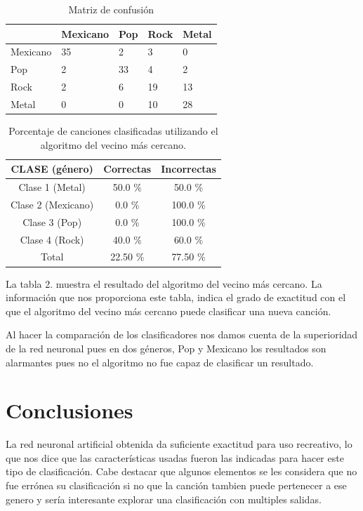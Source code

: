 \documentclass[conference]{IEEEtran}
\begin{document}
\begin{table}[h]
	\renewcommand{\tablename}{Tabla}
	\centering
	\caption{Matriz de confusión}
	\label{my-label}
	\begin{tabular}{l|l|l|l|l|}
	\cline{2-5}
							& Mexicano  & Pop & Rock & Metal \\ \hline
	\multicolumn{1}{|l|}{Mexicano} & 35 & 2  & 3  & 0  \\ \hline
	\multicolumn{1}{|l|}{Pop} &  2  & 33  & 4  &  2 \\ \hline
	\multicolumn{1}{|l|}{Rock} &  2  &  6 &  19 & 13  \\ \hline
	\multicolumn{1}{|l|}{Metal} &  0  & 0  & 10  & 28  \\ \hline
	\end{tabular}
	\end{table}


 

\begin{table}[h]
\renewcommand{\arraystretch}{1.3}
\renewcommand{\tablename}{Tabla}
\caption{ Porcentaje de canciones clasificadas utilizando el algoritmo del vecino más cercano. }
\label{table_example}
\centering
\begin{tabular}{|c|c|c|}
\hline
CLASE (género) & Correctas & Incorrectas \\
\hline
Clase 1 (Metal) & 50.0 \% & 50.0 \% \\
\hline
Clase 2 (Mexicano) & 0.0 \% & 100.0 \% \\
\hline
Clase 3 (Pop) & 0.0 \% & 100.0 \% \\
\hline
Clase 4 (Rock) & 40.0 \% & 60.0 \% \\
\hline
Total & 22.50 \% & 77.50 \% \\
\hline
\end{tabular}
\end{table}

La tabla 2. muestra el resultado del algoritmo del vecino más cercano. La información que nos proporciona este tabla, indica el grado de exactitud con el que el algoritmo del vecino más cercano puede clasificar una nueva canción.

Al hacer la comparación  de los clasificadores nos damos cuenta de la superioridad de la red neuronal pues en dos géneros, Pop y Mexicano los resultados son alarmantes pues no el algoritmo no fue capaz de clasificar un resultado.  \\

\section{Conclusiones}
La red neuronal artificial obtenida da suficiente exactitud para uso recreativo, lo que nos dice que las características usadas fueron las indicadas para hacer este tipo de clasificación. Cabe destacar que algunos elementos se les considera que no fue errónea su clasificación si no que la canción tambien puede pertenecer a ese genero y sería interesante explorar una clasificación con multiples salidas. 
\end{document}

